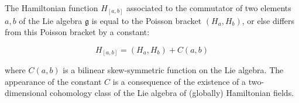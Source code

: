The Hamiltonian function $H_{[a,b]}$ associated to the commutator of two elements $a,b$ of the Lie algebra $\mathfrak{g}$ is equal to the Poisson bracket $(H_a, H_b)$, or else differs from this Poisson bracket by a constant:

$$H_{[a,b]} = (H_a, H_b) + C(a,b)$$

where $C(a,b)$ is a bilinear skew-symmetric function on the Lie algebra. The appearance of the constant $C$ is a consequence of the existence of a two-dimensional cohomology class of the Lie algebra of (globally) Hamiltonian fields.
